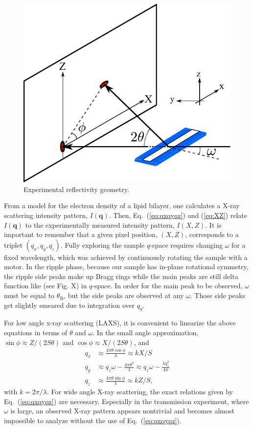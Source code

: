 \begin{figure}[htbp]
  \centering
  \includegraphics[width=\textwidth]{figures/ripple/laxs_setup}
  \caption{Experimental reflectivity geometry.}
  \label{fig:laxs_setup}
\end{figure}

From a model for the electron density of a lipid bilayer, one calculates
a X-ray scattering intensity pattern, $I(\mathbf{q})$. Then, Eq.~(\ref{eq:qxqyqz})
and (\ref{eq:XZ}) relate $I(\mathbf{q})$ to the experimentally measured
intensity pattern, $I(X,Z)$. It is important to remember that a given pixel
position, $(X,Z)$, corresponds to a triplet $(q_x, q_y, q_z)$. Fully exploring 
the sample $q$-space requires changing $\omega$ for a fixed wavelength, which was
achieved by continuously rotating the sample with a motor. In the ripple phase, 
because our sample has in-plane rotational symmetry,
the ripple side peaks make up Bragg rings while the main peaks are still 
delta function like (see Fig. X) in $q$-space. In order for the main peak to be
observed, $\omega$ must be equal to $\theta_\mathrm{B}$, but the side peaks
are observed at any $\omega$. Those side peaks get slightly smeared due to 
integration over $q_y$.

For low angle x-ray scattering (LAXS), it is convenient to linearize the above
equations in terms of $\theta$ and $\omega$. In the small angle approximation, 
$\sin\phi \approx Z/(2S\theta)$ and $\cos\phi \approx X/(2S\theta)$, and
\begin{align}
  q_x &\approx \frac{4\pi\theta\cos\phi}{\lambda} \approx kX/S \nonumber\\
  q_y &\approx q_z\omega -\frac{4\pi\theta^2}{\lambda} \approx q_z\omega - \frac{\lambda q_z^2}{4\pi}\nonumber\\
  q_z &\approx \frac{4\pi\theta\sin\phi}{\lambda} \approx kZ/S,
  \label{eq:qxqyqz_small}
\end{align}
with $k=2\pi/\lambda$. For wide angle X-ray scattering, the exact relations given
by Eq.~(\ref{eq:qxqyqz}) are necessary. Especially in the transmission experiment,
where $\omega$ is large, an observed X-ray pattern appears nontrivial and becomes
almost impossible to analyze without the use of Eq.~(\ref{eq:qxqyqz}).


